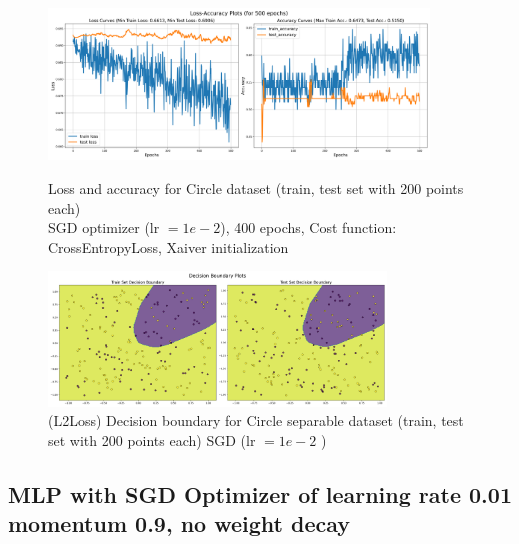 \begin{solve}
\begin{figure}[H]
    \centering
    \includegraphics[width=0.9\textwidth]{plots/5_sinusoid_sgd_morelayers_loss_acc.png}
    \caption{Loss and accuracy for Circle dataset (train, test set with 200 points each)\\ SGD optimizer (lr $=1e-2$), 400 epochs, Cost function: CrossEntropyLoss, Xaiver initialization}
    \includegraphics[width=0.8\textwidth]{plots/5_sinusoid_sgd_morelayers_boundary.png}
    \caption{(L2Loss) Decision boundary for Circle separable dataset (train, test set with 200 points each) 
    SGD (lr $=1e-2$ )}
\end{figure}

\subsection{MLP with SGD Optimizer of learning rate 0.01 momentum 0.9, no weight decay}


\end{solve}
